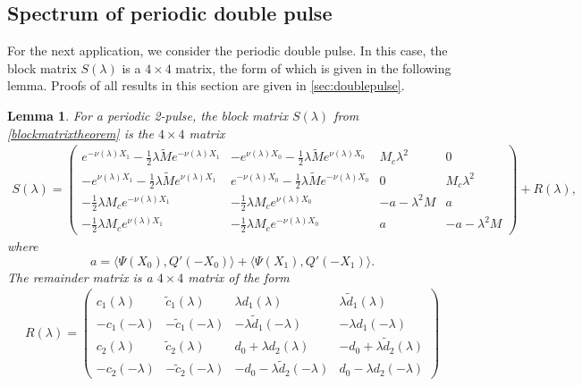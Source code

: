 \documentclass[12pt]{elsarticle}
\theoremstyle{plain}
\newtheorem{lemma}[theorem]{Lemma}
\theoremstyle{definition}
\theoremstyle{remark}
\numberwithin{theorem}{section}
\numberwithin{equation}{section}
\begin{document}
\subsection{Spectrum of periodic double pulse}\label{sec:perdouble}

For the next application, we consider the periodic double pulse. In this case, the block matrix $S(\lambda)$ is a $4\times 4$ matrix, the form of which is given in the following lemma. Proofs of all results in this section are given in \cref{sec:doublepulse}. 

\begin{lemma}\label{lemma:2blockmatrix}
For a periodic 2-pulse, the block matrix $S(\lambda)$ from \cref{blockmatrixtheorem} is the $4 \times 4$ matrix
\begin{align}\label{dpSmatrix}
S(\lambda) = 
\begin{pmatrix}
e^{-\nu(\lambda)X_1} -\frac{1}{2}\lambda \tilde{M} e^{-\nu(\lambda)X_1} & -e^{\nu(\lambda)X_0} -\frac{1}{2}\lambda \tilde{M} e^{\nu(\lambda)X_0} & M_c \lambda^2 & 0 \\
-e^{\nu(\lambda)X_1} -\frac{1}{2}\lambda \tilde{M} e^{\nu(\lambda)X_1} & e^{-\nu(\lambda)X_0} -\frac{1}{2}\lambda \tilde{M} e^{-\nu(\lambda)X_0} & 0 & M_c \lambda^2 \\
-\frac{1}{2}\lambda M_c e^{-\nu(\lambda)X_1} & -\frac{1}{2}\lambda M_c e^{\nu(\lambda)X_0} &-a-\lambda^2 M & a \\
-\frac{1}{2}\lambda M_c e^{\nu(\lambda)X_1} & -\frac{1}{2}\lambda M_c e^{-\nu(\lambda)X_0}  & a & -a-\lambda^2 M
\end{pmatrix} + R(\lambda),
\end{align}
where
\begin{equation}\label{2pa}
a = \langle \Psi(X_0), Q'(-X_0) \rangle + \langle \Psi(X_1), Q'(-X_1) \rangle.
\end{equation}
The remainder matrix is a $4 \times 4$ matrix of the form
\begin{align}
R(\lambda) = 
\begin{pmatrix} 
c_1(\lambda) & \tilde{c}_1(\lambda) & \lambda d_1(\lambda) & \lambda \tilde{d}_1(\lambda) \\ 
-c_1(-\lambda) & -\tilde{c}_1(-\lambda) & -\lambda \tilde{d}_1(-\lambda) & -\lambda d_1(-\lambda) \\ 
c_2(\lambda) & \tilde{c}_2(\lambda) & d_0 + \lambda d_2(\lambda) & -d_0 + \lambda \tilde{d}_2(\lambda) \\ 
-c_2(-\lambda) & -\tilde{c}_2(-\lambda) & -d_0 - \lambda \tilde{d}_2(-\lambda) & d_0 - \lambda d_2(-\lambda)

\end{pmatrix}
\end{align}
\end{lemma}
\end{document}
